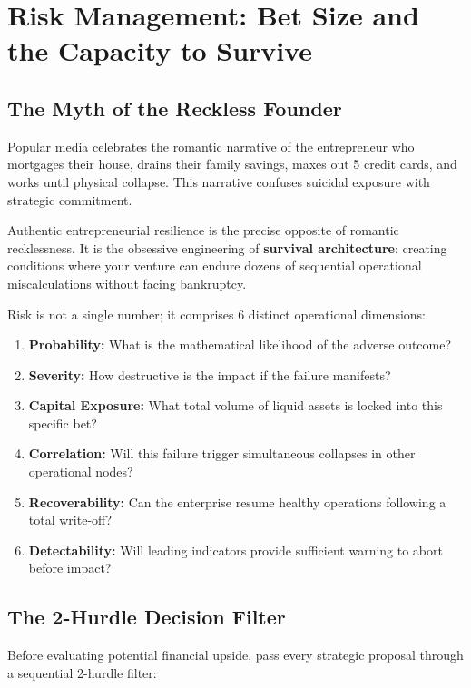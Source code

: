 \section{Risk Management: Bet Size and the Capacity to Survive}

\subsection{The Myth of the Reckless Founder}

Popular media celebrates the romantic narrative of the entrepreneur who mortgages their house, drains their family savings, maxes out 5 credit cards, and works until physical collapse. This narrative confuses suicidal exposure with strategic commitment.

Authentic entrepreneurial resilience is the precise opposite of romantic recklessness. It is the obsessive engineering of \textbf{survival architecture}: creating conditions where your venture can endure dozens of sequential operational miscalculations without facing bankruptcy.

Risk is not a single number; it comprises 6 distinct operational dimensions:
\begin{enumerate}[leftmargin=12pt,itemsep=2pt,topsep=1pt,parsep=0pt]
  \item \textbf{Probability:} What is the mathematical likelihood of the adverse outcome?
  \item \textbf{Severity:} How destructive is the impact if the failure manifests?
  \item \textbf{Capital Exposure:} What total volume of liquid assets is locked into this specific bet?
  \item \textbf{Correlation:} Will this failure trigger simultaneous collapses in other operational nodes?
  \item \textbf{Recoverability:} Can the enterprise resume healthy operations following a total write-off?
  \item \textbf{Detectability:} Will leading indicators provide sufficient warning to abort before impact?
\end{enumerate}

\subsection{The 2-Hurdle Decision Filter}

Before evaluating potential financial upside, pass every strategic proposal through a sequential 2-hurdle filter:

